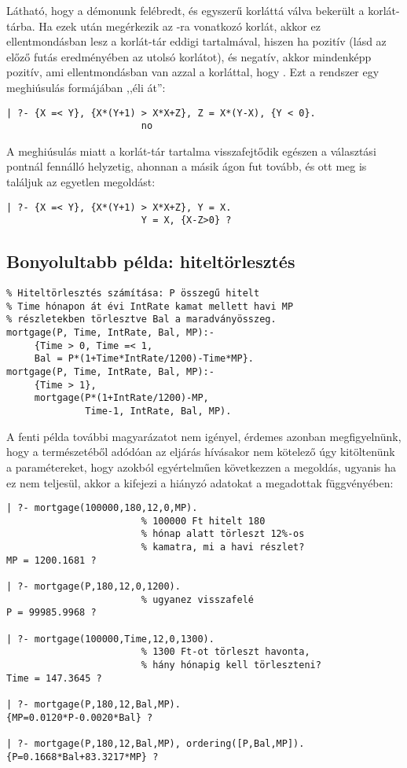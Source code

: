 Látható, hogy a démonunk felébredt, és egyszerű korláttá válva bekerült a
korlát-tárba. Ha ezek után megérkezik az -ra vonatkozó korlát, akkor
ez ellentmondásban lesz a korlát-tár eddigi tartalmával, hiszen ha 
pozitív (lásd az előző futás eredményében az utolsó korlátot), és 
negatív, akkor  mindenképp pozitív, ami ellentmondásban van azzal
a korláttal, hogy . Ezt a rendszer egy meghiúsulás formájában
,,éli át'':

\begin{verbatim}
| ?- {X =< Y}, {X*(Y+1) > X*X+Z}, Z = X*(Y-X), {Y < 0}.
                        no
\end{verbatim}

A meghiúsulás miatt a korlát-tár tartalma visszafejtődik egészen a választási
pontnál fennálló helyzetig, ahonnan a másik ágon fut tovább, és ott meg is
találjuk az egyetlen megoldást:

\begin{verbatim}
| ?- {X =< Y}, {X*(Y+1) > X*X+Z}, Y = X.
                        Y = X, {X-Z>0} ? 
\end{verbatim}

\subsection{Bonyolultabb \clpq példa: hiteltörlesztés}

\begin{verbatim}
% Hiteltörlesztés számítása: P összegű hitelt
% Time hónapon át évi IntRate kamat mellett havi MP
% részletekben törlesztve Bal a maradványösszeg.
mortgage(P, Time, IntRate, Bal, MP):-
     {Time > 0, Time =< 1,
     Bal = P*(1+Time*IntRate/1200)-Time*MP}.
mortgage(P, Time, IntRate, Bal, MP):-
     {Time > 1},
     mortgage(P*(1+IntRate/1200)-MP, 
              Time-1, IntRate, Bal, MP).
\end{verbatim}

A fenti \clpq példa további magyarázatot nem igényel, érdemes azonban
megfigyelnünk, hogy a \clpq természetéből adódóan az eljárás hívásakor
nem kötelező úgy kitöltenünk a paramétereket, hogy azokból egyértelműen
következzen a megoldás, ugyanis ha ez nem teljesül, akkor a \clpq
kifejezi a hiányzó adatokat a megadottak függvényében:

\begin{verbatim}
| ?- mortgage(100000,180,12,0,MP).
                        % 100000 Ft hitelt 180        
                        % hónap alatt törleszt 12%-os 
                        % kamatra, mi a havi részlet?                 
MP = 1200.1681 ? 

| ?- mortgage(P,180,12,0,1200).         
                        % ugyanez visszafelé
P = 99985.9968 ? 

| ?- mortgage(100000,Time,12,0,1300).   
                        % 1300 Ft-ot törleszt havonta,
                        % hány hónapig kell törleszteni?                      
Time = 147.3645 ? 

| ?- mortgage(P,180,12,Bal,MP). 
{MP=0.0120*P-0.0020*Bal} ? 

| ?- mortgage(P,180,12,Bal,MP), ordering([P,Bal,MP]).
{P=0.1668*Bal+83.3217*MP} ? 
\end{verbatim}


